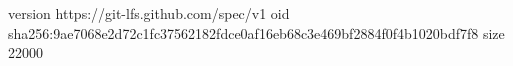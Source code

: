 version https://git-lfs.github.com/spec/v1
oid sha256:9ae7068e2d72c1fc37562182fdce0af16eb68c3e469bf2884f0f4b1020bdf7f8
size 22000
